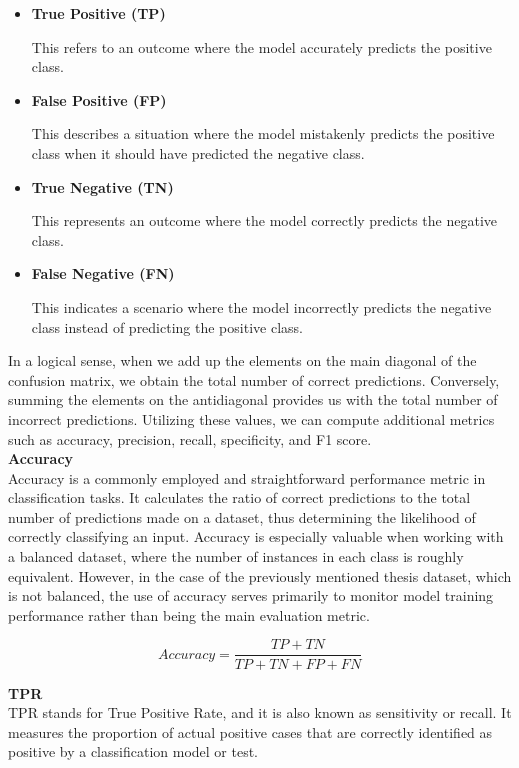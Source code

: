 \begin{itemize}
\item \textbf{True Positive (TP)}

This refers to an outcome where the model accurately predicts the positive class.
\item \textbf{False Positive (FP)}

This describes a situation where the model mistakenly predicts the positive class when it should have predicted the negative class.
\item \textbf{True Negative (TN)}

This represents an outcome where the model correctly predicts the negative class.
\item \textbf{False Negative (FN)}

This indicates a scenario where the model incorrectly predicts the negative class instead of predicting the positive class.

\end{itemize}

In a logical sense, when we add up the elements on the main diagonal of the confusion matrix, we obtain the total number of correct predictions. Conversely, summing the elements on the antidiagonal provides us with the total number of incorrect predictions. Utilizing these values, we can compute additional metrics such as accuracy, precision, recall, specificity, and F1 score. \\

\vspace{0.5cm}
\textbf{Accuracy} \\

\noindent Accuracy is a commonly employed and straightforward performance metric in classification tasks. It calculates the ratio of correct predictions to the total number of predictions made on a dataset, thus determining the likelihood of correctly classifying an input. Accuracy is especially valuable when working with a balanced dataset, where the number of instances in each class is roughly equivalent. However, in the case of the previously mentioned thesis dataset, which is not balanced, the use of accuracy serves primarily to monitor model training performance rather than being the main evaluation metric. 

\[Accuracy = \frac{TP + TN}{TP + TN + FP + FN}\]

\vspace{0.5cm}
\textbf{TPR} \\

TPR stands for True Positive Rate, and it is also known as sensitivity or recall. It measures the proportion of actual positive cases that are correctly identified as positive by a classification model or test.

